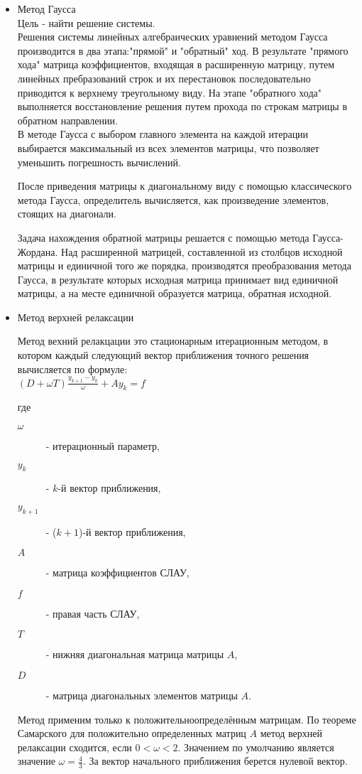 \documentclass[a4paper,12pt,titlepage,finall]{article}
\begin{document}
\begin{itemize}
\item Метод Гаусса\\
Цель - найти решение системы.\\
Решения системы линейных алгебраических уравнений методом Гаусса
производится в два этапа:"прямой" и "обратный" ход.
В результате "прямого хода" матрица коэффициентов, входящая в расширенную матрицу,
путем линейных пребразований строк и их перестановок 
последовательно приводится к верхнему треугольному виду.
На этапе "обратного хода" выполняется восстановление решения путем
прохода по строкам матрицы в обратном направлении.\\
В методе Гаусса с выбором главного элемента
на каждой итерации выбирается максимальный из всех элементов матрицы, что позволяет
уменьшить погрешность вычислений.
 
После приведения матрицы к диагональному виду с помощью классического метода Гаусса, определитель вычисляется, как произведение элементов, стоящих на диагонали.

Задача нахождения обратной матрицы решается с помощью метода Гаусса-Жордана. 
Над расширенной матрицей, составленной из столбцов исходной матрицы и единичной
того же порядка, производятся преобразования метода Гаусса, в результате которых
исходная матрица принимает вид единичной матрицы, а на месте единичной образуется
матрица, обратная исходной.\\
\item Метод верхней релаксации

Метод вехний релакцации это стационарным итерационным методом, 
в котором каждый следующий вектор приближения точного решения вычисляется по формуле:\\
$ (D + \omega T) \frac{y_{k+1} - y_k}{\omega} + A y_k = f $

где 

\begin{description}
    \item[$\omega$] - итерационный параметр, \\
    \item[$y_k$] - $k$-й вектор приближения, \\
    \item[$y_{k+1}$] - ($k+1$)-й вектор приближения, \\
    \item[$A$] - матрица коэффициентов СЛАУ, \\
    \item[$f$] - правая часть СЛАУ, \\
    \item[$T$] - нижняя диагональная матрица матрицы $A$, \\
    \item[$D$] - матрица диагональных элементов матрицы $A$. \\
\end{description}
Метод применим только к положительноопределённым матрицам.
По теореме Самарского для положительно определенных матриц $A$
метод верхней релаксации сходится, если $0 < \omega < 2$. Значением по умолчанию является значение $\omega = \frac{4}{3}$.
За вектор начального приближения берется нулевой вектор.
\end{itemize}
\newpage
\end{document}
